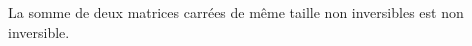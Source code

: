 La somme de deux matrices carrées de même taille non inversibles est non inversible.

\begin{reponses}
\end{reponses}

